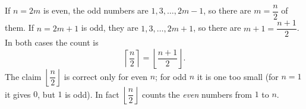If $n=2m$ is even, the odd numbers are $1,3,\dots,2m-1$, so there are $m=\dfrac n2$ of them. If $n=2m+1$ is odd, they are $1,3,\dots,2m+1$, so there are $m+1=\dfrac{n+1}2$. In both cases the count is
\[\boxed{\left\lceil\dfrac n2\right\rceil=\left\lfloor\dfrac{n+1}2\right\rfloor}.\]
The claim $\left\lfloor\dfrac n2\right\rfloor$ is correct only for even $n$; for odd $n$ it is one too small (for $n=1$ it gives $0$, but $1$ is odd). In fact $\left\lfloor\dfrac n2\right\rfloor$ counts the \emph{even} numbers from $1$ to $n$.
